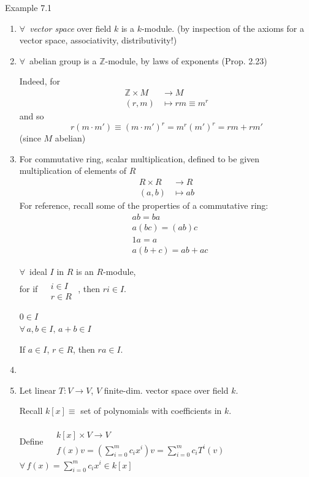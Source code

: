 Example 7.1 \begin{enumerate}
	\item[(i)] $\forall \, $ \emph{vector space} over field $k$ is a $k$-module.  (by inspection of the axioms for a vector space, associativity, distributivity!)
	\item[(ii)] $\forall \, $ abelian group is a $\mathbb{Z}$-module, by laws of exponents (Prop. 2.23)
	
	Indeed, for
	\[
	\begin{aligned}
	\mathbb{Z} \times M & \to M \\ 
	(r,m) & \mapsto rm \equiv m^r 
	\end{aligned}
	\]
	and so
	\[
	r(m\cdot m') \equiv (m\cdot m')^r = m^r (m')^r = rm + rm' 
	\]
	(since $M$ abelian)
	\item[(iii)] For commutative ring, scalar multiplication, defined to be given multiplication of elements of $R$
	\[
	\begin{aligned}
	R\times R & \to R \\
	(a,b) & \mapsto ab 
	\end{aligned}
	\]
	For reference, recall some of the properties of a commutative ring:
	\[
	\begin{aligned}
	& ab = ba \\ 
	& a(bc) = (ab)c \\ 
	& 1a = a \\ 
	& a(b+c) = ab + ac
	\end{aligned}
	\]
	
	$\forall \, $ ideal $I$ in $R$ is an $R$-module, \\
	for if $\begin{aligned} & \quad \\
	& i \in I \\
	& r\in R \end{aligned}$ , then $ri \in I$.
	
	$0\in I$ \\
	$\forall \, a,b \in I, \, a+b \in I$
	
	
	If $a\in I$, $r\in R$, then $ra \in I$.
	
	
	\item[(iv)]
	\item[(v)] Let linear $T:V \to V$, $V$ finite-dim. vector space over field $k$.  
	
	Recall $k[x] \equiv $ set of polynomials with coefficients in $k$.  
	
	Define $\begin{aligned} & \quad \\
	& k[x] \times V \to V \\
	& f(x)v =\left(\sum_{i=0}^m c_i x^i\right)v =\sum_{i=0}^m c_iT^i(v) \end{aligned}$ \quad \, $\forall \, f(x) = \sum_{i=0}^m c_ix^i \in k[x]$
	

\end{enumerate}

